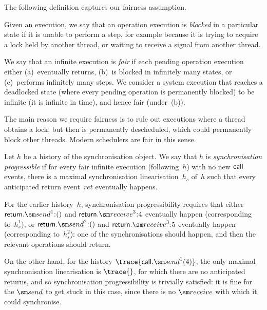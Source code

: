 
The following definition captures our fairness assumption.
%
\begin{definition}
Given an execution, we say 
that an operation execution is \emph{blocked} in a particular state if it is
unable to perform a step, for example because it is trying to acquire a lock
held by another thread, or waiting to receive a signal from another thread.

We say that an infinite execution is \emph{fair} if each pending operation
execution either (a)~eventually returns, (b)~is blocked in infinitely many
states, or (c)~performs infinitely many steps.  We consider a system execution
that reaches a deadlocked state (where every pending operation is permanently
blocked) to be infinite (it is infinite in time), and hence fair (under~(b)).
\end{definition}

The main reason we require fairness is to rule out executions where a thread
obtains a lock, but then is permanently descheduled, which could permanently
block other threads.  Modern schedulers are fair in this sense.


\begin{definition}
Let $h$ be a history of the synchronisation object.  We say that $h$ is
\emph{synchronisation progressible} if for every fair infinite execution
(following~$h$) with no new $\mathsf{call}$ events, there is a maximal synchronisation
linearisation~$h_s$ of~$h$ such that every anticipated return event~$ret$
eventually happens.
\end{definition}





For the earlier history~$h$, synchronisation progressibility
requires that either $\return.\send^1\::()$ and $\return.\receive^3\::4$
eventually happen (corresponding to~$h_s^1$), or $\return.\send^2\::()$ and
$\return.\receive^3\::5$ eventually happen (corresponding to~$h_s^2$): one of
the synchronisations should happen, and then the relevant operations should
return. 

On the other hand, for the history $\trace{\call.\send^1(4)}$, the only
maximal synchronisation linearisation is $\trace{}$, for which there are no
anticipated returns, and so synchronisation progressibility is trivially
satisfied: it is fine for the $\send$ to get stuck in this case, since there
is no $\receive$ with which it could synchronise.
